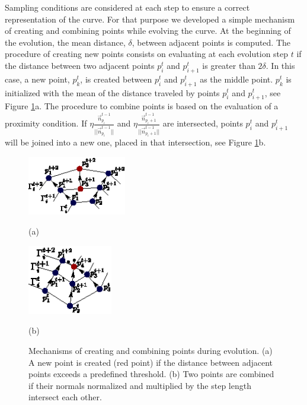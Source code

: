 \documentclass{article}
\begin{document}
Sampling conditions are considered at each step to ensure a correct representation of the curve. For that purpose we developed a simple mechanism of creating and combining points while evolving the curve. At the beginning of the evolution, the mean distance, $\delta$, between adjacent points is computed. The procedure of creating new points consists on evaluating at each evolution step $t$ if the distance between two adjacent points $p_i^t$ and $p_{i+1}^t$ is greater than $2\delta$. In this case, a new point, $p_k^t$, is created between $p_i^t$ and $p_{i+1}^t$ as the middle point. $p_k^t$ is initialized with the mean of the distance traveled by points $p_i^t$ and $p_{i+1}^t$, see Figure \ref{fig:nacimiento_y_muerte}a. The procedure to combine points is based on the evaluation of a proximity condition. If $\eta\frac{\vec{n}_{p_i}^{t-1}}{||\vec{n}_{p_i}^{t-1}||}$ and $\eta\frac{\vec{n}_{p_i+1}^{t-1}}{||\vec{n}_{p_i+1}^{t-1}||}$ are intersected, points $p_i^t$ and $p_{i+1}^t$ will be joined into a new one, placed in that intersection, see Figure \ref{fig:nacimiento_y_muerte}b.
\begin{figure}[t]
\begin{minipage}[b]{.5\linewidth}
  \centering
  \centerline{\includegraphics[width=4.3cm]{pics/nacimiento}}
  \centerline{(a)}\medskip
\end{minipage}
\hfill
\begin{minipage}[b]{.48\linewidth}
  \centering
  \centerline{\includegraphics[width=3.7cm]{pics/muerte}}
  \centerline{(b)}\medskip
\end{minipage}
\caption{Mechanisms of creating and combining points during evolution. (a) A new point is created (red point) if the distance between adjacent points exceeds a predefined threshold. (b) Two points are combined if their normals normalized and multiplied by the step length intersect each other.}
\label{fig:nacimiento_y_muerte}
\end{figure}
\end{document}

